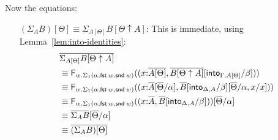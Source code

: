 \documentclass[10pt]{article}
\theoremstyle{definition}
\newcommand\dsd[1]{\ensuremath{\mathsf{#1}}}
\newcommand{\app}[2]{\ensuremath{#1 \: #2}}
\newcommand{\telety}[3]{\ensuremath{(#1{:}#2,#3)}}
\newcommand{\fst}[1]{\app{\dsd{fst}}{#1}}
\newcommand{\snd}[1]{\app{\dsd{snd}}{#1}}
\newcommand\F[2]{\ensuremath{\mathsf{F}_{#1}(#2)}}
\begin{document}
Now the equations:
\begin{enumerate}[style = multiline, labelwidth = 80pt]
\item[{$(\Sigma_A B)[\Theta] \equiv \Sigma_{A[\Theta]} B[\Theta \uparrow A]$}:] This is immediate, using Lemma~\ref{lem:into-identities}:
\begin{align*}
&\upstairs{\Sigma_{A[\Theta]} B[\Theta \uparrow A]} \\
&\equiv \F{w. \Sigma_1(\alpha,\fst w, \snd w)}{\telety{x}{\upstairs{A[\Theta]}}{\upstairs{B[\Theta \uparrow A]}[\into{\Gamma, A[\Theta]}/\beta]}} \\
&\equiv \F{w. \Sigma_1(\alpha,\fst w, \snd w)}{\telety{x}{\upstairs{A}[\upstairs{\Theta}/\alpha]}{\upstairs{B}[\into{\Delta, A}/\beta][\upstairs{\Theta}/\alpha, x / x]}} \\
&\equiv \F{w. \Sigma_1(\alpha,\fst w, \snd w)}{\telety{x}{\upstairs{A}}{\upstairs{B}[\into{\Delta, A}/\beta]}}[\upstairs{\Theta}/\alpha] \\
&\equiv \upstairs{\Sigma_A B}[\upstairs{\Theta}/\alpha] \\
&\equiv \upstairs{(\Sigma_A B)[\Theta]}
\end{align*}


\end{enumerate}
\end{document}
